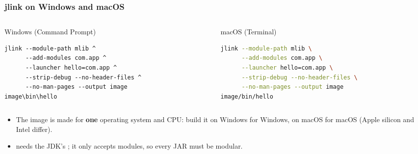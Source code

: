 \documentclass[aspectratio=169,10pt,compress]{beamer}
\begin{document}
\begin{frame}[t,fragile] \frametitle{jlink on Windows and macOS}
  \begin{columns}[T]
    \begin{column}{0.48\textwidth}
      \begin{block}{Windows (Command Prompt)}


\begin{lstlisting}[style=codesnippet, language={}, basicstyle=\ttfamily\scriptsize]
jlink --module-path mlib ^
      --add-modules com.app ^
      --launcher hello=com.app ^
      --strip-debug --no-header-files ^
      --no-man-pages --output image
image\bin\hello
\end{lstlisting}


      \end{block}
    \end{column}
    \begin{column}{0.48\textwidth}
      \begin{block}{macOS (Terminal)}


\begin{lstlisting}[style=codesnippet, language=bash, basicstyle=\ttfamily\scriptsize]
jlink --module-path mlib \
      --add-modules com.app \
      --launcher hello=com.app \
      --strip-debug --no-header-files \
      --no-man-pages --output image
image/bin/hello
\end{lstlisting}


      \end{block}
    \end{column}
  \end{columns}

  \vspace{0.3em}
  \begin{itemize}\small
    \item The image is made for \textbf{one} operating system and CPU: build it on Windows for Windows, on macOS for macOS
      (Apple silicon  and Intel  differ).
    \item {} needs the JDK's ; it only accepts modules, so every JAR must be modular.
  \end{itemize}
\end{frame}
\end{document}

